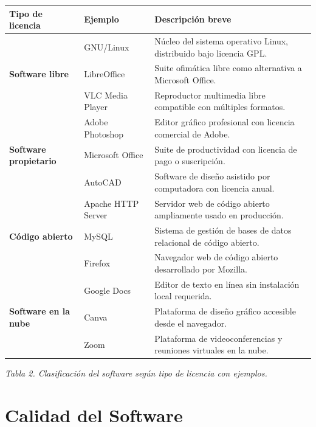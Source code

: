 \documentclass[12pt,a4paper]{article}
\begin{document}
	\begin{center}
		\singlespacing
		\begin{tabular}{|p{3.2cm}|p{3.8cm}|p{6.2cm}|}
			\hline
			\textbf{Tipo de licencia} & \textbf{Ejemplo} & \textbf{Descripción breve} \\ \hline
			\multirow{3}{3.2cm}{\textbf{Software libre}} & GNU/Linux & Núcleo del sistema operativo Linux, distribuido bajo licencia GPL. \\ \cline{2-3}
			& LibreOffice & Suite ofimática libre como alternativa a Microsoft Office. \\ \cline{2-3}
			& VLC Media Player & Reproductor multimedia libre compatible con múltiples formatos. \\ \hline
			\multirow{3}{3.2cm}{\textbf{Software propietario}} & Adobe Photoshop & Editor gráfico profesional con licencia comercial de Adobe. \\ \cline{2-3}
			& Microsoft Office & Suite de productividad con licencia de pago o suscripción. \\ \cline{2-3}
			& AutoCAD & Software de diseño asistido por computadora con licencia anual. \\ \hline
			\multirow{3}{3.2cm}{\textbf{Código abierto}} & Apache HTTP Server & Servidor web de código abierto ampliamente usado en producción. \\ \cline{2-3}
			& MySQL & Sistema de gestión de bases de datos relacional de código abierto. \\ \cline{2-3}
			& Firefox & Navegador web de código abierto desarrollado por Mozilla. \\ \hline
			\multirow{3}{3.2cm}{\textbf{Software en la nube}} & Google Docs & Editor de texto en línea sin instalación local requerida. \\ \cline{2-3}
			& Canva & Plataforma de diseño gráfico accesible desde el navegador. \\ \cline{2-3}
			& Zoom & Plataforma de videoconferencias y reuniones virtuales en la nube. \\ \hline
		\end{tabular}
		
		\vspace{0.3cm}
		\textit{Tabla 2. Clasificación del software según tipo de licencia con ejemplos.}
	\end{center}
	
	\doublespacing
	
	\section{Calidad del Software}
	
\end{document}
